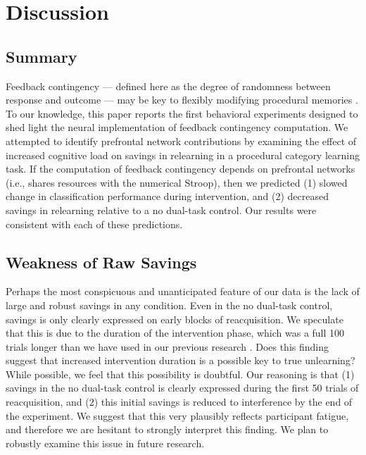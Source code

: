 \section*{Discussion}
\subsection*{Summary}
Feedback contingency --- defined here as the degree of randomness between
response and outcome --- may be key to flexibly modifying procedural memories
\cite{crossley_erasing_2013}. To our knowledge, this paper reports the first
behavioral experiments designed to shed light the neural implementation of
feedback contingency computation. We attempted to identify prefrontal network
contributions by examining the effect of increased cognitive load on savings in
relearning in a procedural category learning task. If the computation of
feedback contingency depends on prefrontal networks (i.e., shares resources with
the numerical Stroop), then we predicted (1) slowed change in classification
performance during intervention, and (2) decreased savings in relearning
relative to a no dual-task control. Our results were consistent with each of
these predictions.

\subsection*{Weakness of Raw Savings}
Perhaps the most conspicuous and unanticipated feature of our data is the lack
of large and robust savings in any condition. Even in the no dual-task control,
savings is only clearly expressed on early blocks of reacquisition. We speculate
that this is due to the duration of the intervention phase, which was a full 100
trials longer than we have used in our previous research
\cite{crossley_erasing_2013, crossley_renewal_2014}. Does this finding suggest
that increased intervention duration is a possible key to true unlearning? While
possible, we feel that this possibility is doubtful. Our reasoning is that (1)
savings in the no dual-task control is clearly expressed during the first 50
trials of reacquisition, and (2) this initial savings is reduced to interference
by the end of the experiment. We suggest that this very plausibly reflects
participant fatigue, and therefore we are hesitant to strongly interpret this
finding. We plan to robustly examine this issue in future research.

